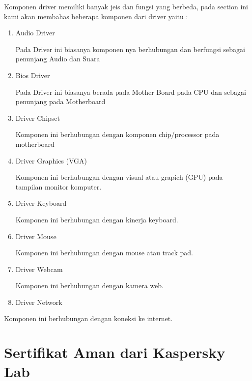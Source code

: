 Komponen driver memiliki banyak jeis dan fungsi yang berbeda, pada section ini kami akan membahas beberapa komponen dari driver yaitu : 
\begin{enumerate}
\item Audio Driver

Pada Driver ini biasanya komponen nya berhubungan dan berfungsi sebagai penunjang Audio dan Suara

\item Bios Driver

Pada Driver ini biasanya berada pada Mother Board pada CPU dan sebagai penunjang pada Motherboard

\item Driver Chipset 

 Komponen ini berhubungan dengan komponen chip/processor pada motherboard
\item Driver Graphics (VGA) 

 Komponen ini berhubungan dengan visual atau grapich (GPU) pada tampilan monitor komputer.
\item Driver Keyboard 

 Komponen ini berhubungan dengan kinerja keyboard.
\item Driver Mouse

 Komponen ini berhubungan dengan mouse atau track pad.
\item Driver Webcam 

 Komponen ini berhubungan dengan kamera web.
\item Driver Network 
\end{enumerate}
 Komponen ini berhubungan dengan koneksi ke internet.


\section{Sertifikat Aman dari Kaspersky Lab}

